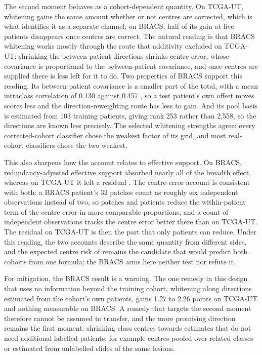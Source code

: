 \documentclass[11pt]{article}
\begin{document}
The second moment behaves as a cohort-dependent quantity. On TCGA-UT, whitening gains the same amount whether or not centres are corrected, which is what identifies it as a separate channel; on BRACS, half of its gain at five patients disappears once centres are correct. The natural reading is that BRACS whitening works mostly through the route that additivity excluded on TCGA-UT: shrinking the between-patient directions shrinks centre error, whose covariance is proportional to the between-patient covariance, and once centres are supplied there is less left for it to do. Two properties of BRACS support this reading. Its between-patient covariance is a smaller part of the total, with a mean intraclass correlation of 0.130 against 0.457 \citep{queisler2026effectiveSupport}, so a test patient's own offset moves scores less and the direction-reweighting route has less to gain. And its pool basis is estimated from 103 training patients, giving rank 253 rather than 2,558, so the directions are known less precisely. The selected whitening strengths agree: every corrected-cohort classifier chose the weakest factor of its grid, and most real-cohort classifiers chose the two weakest.

This also sharpens how the account relates to effective support. On BRACS, redundancy-adjusted effective support absorbed nearly all of the breadth effect, whereas on TCGA-UT it left a residual \citep{queisler2026effectiveSupport,queisler2026multidirectionalRedundancy}. The centre-error account is consistent with both: a BRACS patient's 32 patches count as roughly six independent observations instead of two, so patches and patients reduce the within-patient term of the centre error in more comparable proportions, and a count of independent observations tracks the centre error better there than on TCGA-UT. The residual on TCGA-UT is then the part that only patients can reduce. Under this reading, the two accounts describe the same quantity from different sides, and the expected centre risk of \citet{queisler2026centreError} remains the candidate that would predict both cohorts from one formula; the BRACS arms here neither test nor refute it.

For mitigation, the BRACS result is a warning. The one remedy in this design that uses no information beyond the training cohort, whitening along directions estimated from the cohort's own patients, gains 1.27 to 2.26 points on TCGA-UT and nothing measurable on BRACS. A remedy that targets the second moment therefore cannot be assumed to transfer, and the more promising direction remains the first moment: shrinking class centres towards estimates that do not need additional labelled patients, for example centres pooled over related classes or estimated from unlabelled slides of the same lesions.
\end{document}
